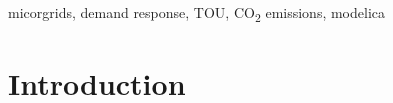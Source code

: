 \documentclass[conference]{IEEEtran}
\begin{document}
\begin{IEEEkeywords}
micorgrids, demand response, TOU, CO\textsubscript{2} emissions, modelica
\end{IEEEkeywords}


%
%
%
%
%
%
%
%
%
%
%
%
%
%
%
%
%
\section{Introduction}
\end{document}
